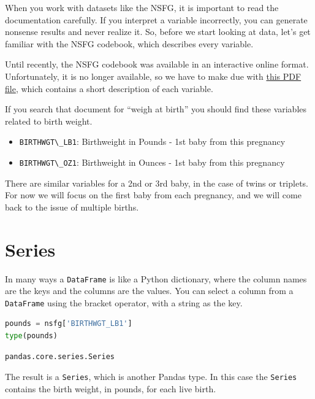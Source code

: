 When you work with datasets like the NSFG, it is important to read the
documentation carefully. If you interpret a variable incorrectly, you
can generate nonsense results and never realize it. So, before we start
looking at data, let's get familiar with the NSFG codebook, which
describes every variable.

Until recently, the NSFG codebook was available in an interactive online
format. Unfortunately, it is no longer available, so we have to make due
with
\href{https://github.com/AllenDowney/ElementsOfDataScience/raw/master/data/2015-2017_NSFG_FemPregFile_Codebook-508.pdf}{this
PDF file}, which contains a short description of each variable.

If you search that document for ``weigh at birth'' you should find these
variables related to birth weight.

\begin{itemize}
\item
  \passthrough{\lstinline!BIRTHWGT\_LB1!}: Birthweight in Pounds - 1st
  baby from this pregnancy
\item
  \passthrough{\lstinline!BIRTHWGT\_OZ1!}: Birthweight in Ounces - 1st
  baby from this pregnancy
\end{itemize}

There are similar variables for a 2nd or 3rd baby, in the case of twins
or triplets. For now we will focus on the first baby from each
pregnancy, and we will come back to the issue of multiple births.

\hypertarget{series}{%
\section{Series}\label{series}}

In many ways a \passthrough{\lstinline!DataFrame!} is like a Python
dictionary, where the column names are the keys and the columns are the
values. You can select a column from a
\passthrough{\lstinline!DataFrame!} using the bracket operator, with a
string as the key.

\begin{lstlisting}[language=Python,style=source]
pounds = nsfg['BIRTHWGT_LB1']
type(pounds)
\end{lstlisting}

\begin{lstlisting}[style=output]
pandas.core.series.Series
\end{lstlisting}

The result is a \passthrough{\lstinline!Series!}, which is another
Pandas type. In this case the \passthrough{\lstinline!Series!} contains
the birth weight, in pounds, for each live birth.

